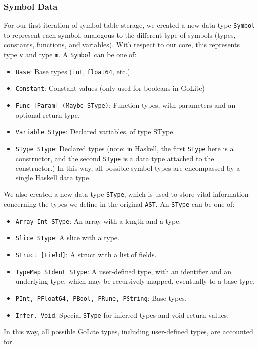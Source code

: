 \documentclass[11pt]{article}
\begin{document}
\subsubsection{Symbol Data}
For our first iteration of symbol table storage, we created a new data
type \texttt{Symbol} to represent each symbol, analogous to the
different type of symbols (types, constants, functions, and
variables).  With respect to our core, this represents type \texttt{v}
and type \texttt{m}.  A \texttt{Symbol} can be one of:
\begin{itemize}
\item \texttt{Base}: Base types (\texttt{int}, \texttt{float64}, etc.)
\item \texttt{Constant}: Constant values (only used for booleans in
  GoLite)
\item \texttt{Func [Param] (Maybe SType)}: Function types, with
  parameters and an optional return type.
\item \texttt{Variable SType}: Declared variables, of type SType.
\item \texttt{SType SType}: Declared types (note: in Haskell, the
  first \texttt{SType} here is a constructor, and the second
  \texttt{SType} is a data type attached to the constructor.)  In this
  way, all possible symbol types are encompassed by a single Haskell
  data type.
\end{itemize}

We also created a new data type \texttt{SType}, which is used to store
vital information concerning the types we define in the original
\texttt{AST}.  An \texttt{SType} can be one of:
\begin{itemize}
\item \texttt{Array Int SType}: An array with a length and a type.
\item \texttt{Slice SType}: A slice with a type.
\item \texttt{Struct [Field]}: A struct with a list of fields.
\item \texttt{TypeMap SIdent SType}: A user-defined type, with an
  identifier and an underlying type, which may be recursively mapped,
  eventually to a base type.
\item \texttt{PInt, PFloat64, PBool, PRune, PString}: Base types.
\item \texttt{Infer, Void}: Special \texttt{SType} for inferred types
  and void return values.
\end{itemize}
In this way, all possible GoLite types, including user-defined types,
are accounted for.
\end{document}
